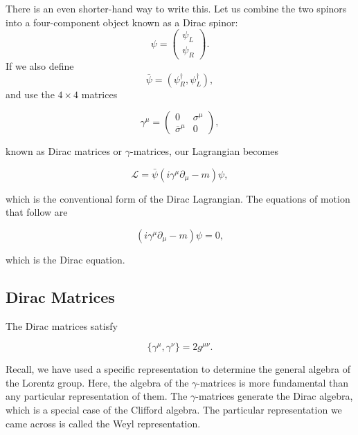 \documentclass[11pt]{article}
\theoremstyle{definition}
\begin{document}
There is an even shorter-hand way to write this. Let us combine the two spinors into a four-component object known as a Dirac spinor:
\begin{equation}
\psi = \begin{pmatrix}
\psi_{L} \\
\psi_{R}
\end{pmatrix}.
\end{equation}
If we also define  
\begin{equation}
\bar{\psi} = \left( \psi_R^\dagger, \psi_L^\dagger \right),
\end{equation}  
and use the \(4 \times 4\) matrices  
\begin{shaded}
\begin{equation}
\gamma^\mu = \begin{pmatrix}
0 & \sigma^\mu \\
\bar{\sigma}^\mu & 0
\end{pmatrix},
\end{equation}
\end{shaded}
known as Dirac matrices or \(\gamma\)-matrices, our Lagrangian becomes  
\begin{shaded}
    \begin{equation}
\mathcal{L} = \bar{\psi}(i\gamma^\mu \partial_\mu - m)\psi,
\end{equation}
\end{shaded}
which is the conventional form of the Dirac Lagrangian. The equations of motion that follow are  
\begin{shaded}
    \begin{equation}
(i\gamma^\mu \partial_\mu - m)\psi = 0,
\end{equation}
\end{shaded}
which is the Dirac equation.

\subsection{Dirac Matrices}
The Dirac matrices satisfy
\begin{shaded}
    \begin{equation}
        \{\gamma^\mu, \gamma^\nu\} = 2g^{\mu\nu}.
        \label{Eq. gamma1}
    \end{equation}
\end{shaded}
Recall, we have used a specific representation to determine the general algebra of the Lorentz group. Here, the algebra of the $\gamma$-matrices is more fundamental than any particular representation of them. The $\gamma$-matrices generate the Dirac algebra, which is a special case of the Clifford algebra. The particular representation we came across is called the Weyl representation.
\end{document}
